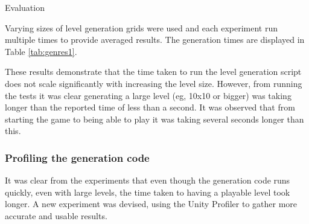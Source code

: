 \documentclass[final]{cmpreport}
\begin{document}
\begin{section}{Evaluation}
\begin{algorithm}[H]
\begin{algorithmic}[1]

\end{algorithmic}
\end{algorithm}

Varying sizes of level generation grids were used and each experiment run multiple times to provide averaged results. The generation times are displayed in Table \ref{tab:genres1}.

\begin{table}

    \centering
    \caption{Timing results from timing the level generation code of varying size of levels}
    \label{tab:genres1}

\end{table}

These results demonstrate that the time taken to run the level generation script does not scale significantly with increasing the level size. However, from running the tests it was clear generating a large level (eg, 10x10 or bigger) was taking longer than the reported time of less than a second. It was observed that from starting the game to being able to play it was taking several seconds longer than this.

\subsubsection{Profiling the generation code}
It was clear from the experiments that even though the generation code runs quickly, even with large levels, the time taken to having a playable level took longer. A new experiment was devised, using the Unity Profiler to gather more accurate and usable results.


\end{section}
\end{document}
